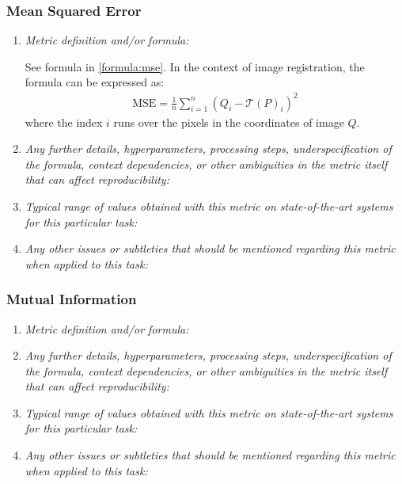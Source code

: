 \documentclass[a4paper,11pt]{article}
\begin{document}
        \subsubsection{Mean Squared Error}
            \begin{enumerate}[label=\alph*.]
                \item \textit{Metric definition and/or formula:}

                See formula in \ref{formula:mse}. In the context of image registration, the formula can be expressed as:
                \begin{align}
                    \mathrm{MSE} = \frac{1}{n} \sum_{i=1}^{n} \left( Q_i - \mathcal{T}(P)_i \right)^2
                \end{align}
                where the index $i$ runs over the pixels in the coordinates of image $Q$. 

                \bigskip
                \item \textit{Any further details, hyperparameters, processing steps, underspecification of the formula, context dependencies, or other ambiguities in the metric itself that can affect reproducibility:}
                \bigskip
                \item \textit{Typical range of values obtained with this metric on state-of-the-art systems for this particular task:}
                \bigskip
                \item \textit{Any other issues or subtleties that should be mentioned regarding this metric when applied to this task:}
                \bigskip
            \end{enumerate}
        \subsubsection{Mutual Information}
            \begin{enumerate}[label=\alph*.]
                \item \textit{Metric definition and/or formula:}
                \bigskip
                \item \textit{Any further details, hyperparameters, processing steps, underspecification of the formula, context dependencies, or other ambiguities in the metric itself that can affect reproducibility:}
                \bigskip
                \item \textit{Typical range of values obtained with this metric on state-of-the-art systems for this particular task:}
                \bigskip
                \item \textit{Any other issues or subtleties that should be mentioned regarding this metric when applied to this task:}
                \bigskip
            \end{enumerate}
\end{document}
